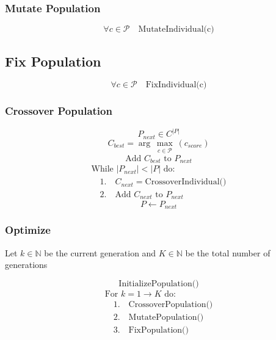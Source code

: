 \documentclass[11pt]{article}
\begin{document}
\subsubsection{Mutate Population}

$$\forall c \in \mathcal{P} \quad \text{MutateIndividual(c)}$$

\subsection{Fix Population}

$$\forall c \in \mathcal{P} \quad \text{FixIndividual(c)}$$

\subsubsection{Crossover Population}

$$P_{next} \in C^{|P|}$$
$$C_{best} = \arg \max_{\substack{c \in \mathcal{P}}}(c_{score})$$
$$\text{Add } C_{best} \text{ to } P_{next}$$
$$\begin{array}{ll}
\text{While } |P_{next}| < |P| \text{ do:} \\
\quad 1. \quad C_{next} = \text{CrossoverIndividual()} \\
\quad 2. \quad \text{Add } C_{next} \text{ to } P_{next}
\end{array}$$
$$P \leftarrow P_{next}$$

\subsubsection{Optimize}

Let $k \in \mathbb{N}$ be the current generation and $K \in \mathbb{N}$ be the total number of generations

$$\text{InitializePopulation()}$$
$$\begin{array}{ll}
\text{For } k = 1 \rightarrow K \text{ do:} \\
\quad 1. \quad \text{CrossoverPopulation()} \\
\quad 2. \quad \text{MutatePopulation()} \\
\quad 3. \quad \text{FixPopulation()}
\end{array}$$
\end{document}
